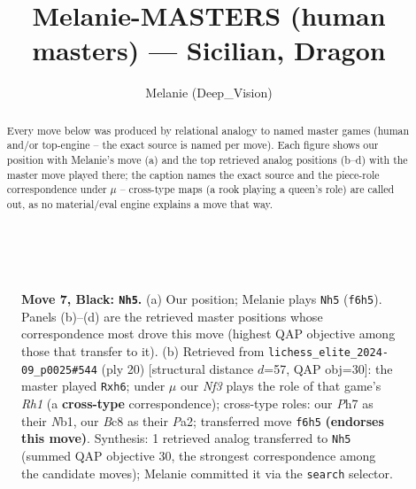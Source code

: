 \documentclass[11pt]{article}
\title{Melanie-MASTERS (human masters) — Sicilian, Dragon}
\author{Melanie (Deep\_Vision)}
\date{}
\begin{document}
\maketitle

\begin{abstract}Every move below was produced by relational analogy to named master games (human and/or top-engine -- the exact source is named per move). Each figure shows our position with Melanie's move (a) and the top retrieved analog positions (b--d) with the master move played there; the caption names the exact source and the piece-role correspondence under $\mu$ -- cross-type maps (a rook playing a queen's role) are called out, as no material/eval engine explains a move that way.\end{abstract}

\begin{figure}[p]\centering
\begin{subfigure}{0.46\textwidth}\centering
\resizebox{\linewidth}{!}{%
\newchessgame
\chessboard[
  setfen={rnbqk2r/pp2ppbp/3p1np1/8/3NP3/2N1BP2/PPP3PP/R2QKB1R b KQkq - 0 7},
  showmover=false,
  pgfstyle=straightmove, color=movearrow, markmove={f6-h5}
]}
\caption{}
\end{subfigure}\hfill
\begin{subfigure}{0.46\textwidth}\centering
\resizebox{\linewidth}{!}{%
\newchessgame
\chessboard[
  setfen={r1bq1rk1/pp2pp2/2n2npb/2p5/3p4/3P1NP1/PPP1PPB1/RN1QK2R w KQ - 0 11},
  showmover=false,
  pgfstyle=straightmove, color=movearrow, markmove={h1-h6}
]}
\caption{}
\end{subfigure}
\\[4pt]

\caption{\textbf{Move 7, Black: \texttt{Nh5}.} (a) Our position; Melanie plays \texttt{Nh5} (\texttt{f6h5}). Panels (b)--(d) are the retrieved master positions whose correspondence most drove this move (highest QAP objective among those that transfer to it). (b) Retrieved from \texttt{lichess\_elite\_2024-09\_p0025\#544} (ply 20) [structural distance $d$=57, QAP obj=30]: the master played \texttt{Rxh6}; under $\mu$ our \emph{Nf3} plays the role of that game's \emph{Rh1} (a \textbf{cross-type} correspondence); cross-type roles: our \emph{P}h7 as their \emph{N}b1, our \emph{B}c8 as their \emph{P}a2; transferred move \texttt{f6h5} \textbf{(endorses this move)}. Synthesis: 1 retrieved analog transferred to \texttt{Nh5} (summed QAP objective 30, the strongest correspondence among the candidate moves); Melanie committed it via the \texttt{search} selector.}
\label{fig:thought-m13}
\end{figure}
\end{document}
